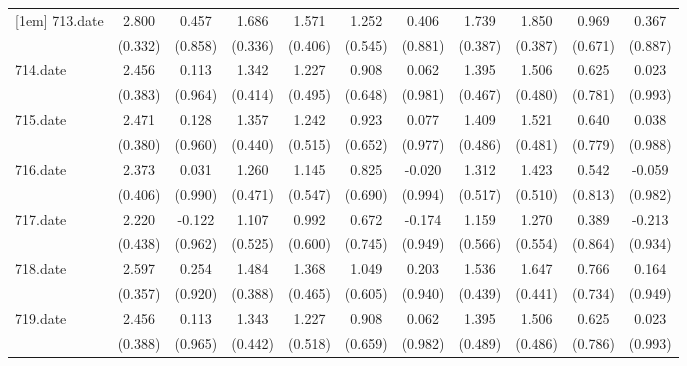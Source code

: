 \begin{tabular}{l*{10}{c}}
[1em]
713.date    &       2.800&       0.457&       1.686&       1.571&       1.252&       0.406&       1.739&       1.850&       0.969&       0.367\\
            &     (0.332)&     (0.858)&     (0.336)&     (0.406)&     (0.545)&     (0.881)&     (0.387)&     (0.387)&     (0.671)&     (0.887)\\
[1em]
714.date    &       2.456&       0.113&       1.342&       1.227&       0.908&       0.062&       1.395&       1.506&       0.625&       0.023\\
            &     (0.383)&     (0.964)&     (0.414)&     (0.495)&     (0.648)&     (0.981)&     (0.467)&     (0.480)&     (0.781)&     (0.993)\\
[1em]
715.date    &       2.471&       0.128&       1.357&       1.242&       0.923&       0.077&       1.409&       1.521&       0.640&       0.038\\
            &     (0.380)&     (0.960)&     (0.440)&     (0.515)&     (0.652)&     (0.977)&     (0.486)&     (0.481)&     (0.779)&     (0.988)\\
[1em]
716.date    &       2.373&       0.031&       1.260&       1.145&       0.825&      -0.020&       1.312&       1.423&       0.542&      -0.059\\
            &     (0.406)&     (0.990)&     (0.471)&     (0.547)&     (0.690)&     (0.994)&     (0.517)&     (0.510)&     (0.813)&     (0.982)\\
[1em]
717.date    &       2.220&      -0.122&       1.107&       0.992&       0.672&      -0.174&       1.159&       1.270&       0.389&      -0.213\\
            &     (0.438)&     (0.962)&     (0.525)&     (0.600)&     (0.745)&     (0.949)&     (0.566)&     (0.554)&     (0.864)&     (0.934)\\
[1em]
718.date    &       2.597&       0.254&       1.484&       1.368&       1.049&       0.203&       1.536&       1.647&       0.766&       0.164\\
            &     (0.357)&     (0.920)&     (0.388)&     (0.465)&     (0.605)&     (0.940)&     (0.439)&     (0.441)&     (0.734)&     (0.949)\\
[1em]
719.date    &       2.456&       0.113&       1.343&       1.227&       0.908&       0.062&       1.395&       1.506&       0.625&       0.023\\
            &     (0.388)&     (0.965)&     (0.442)&     (0.518)&     (0.659)&     (0.982)&     (0.489)&     (0.486)&     (0.786)&     (0.993)\\

\end{tabular}

